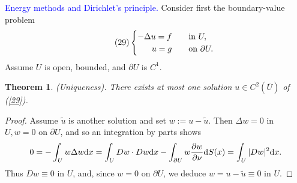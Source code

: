 \documentclass[hyperref,UTF8,12pt]{article}
\numberwithin{equation}{subsection}
\theoremstyle{plain}
\newtheorem{theorem}{Theorem}
\theoremstyle{definition}
\numberwithin{theorem}{section}
\numberwithin{lemma}{section}
\numberwithin{proposition}{section}
\numberwithin{remark}{section}
\numberwithin{corollary}{section}
\numberwithin{definition}{section}
\numberwithin{problem}{section}
\numberwithin{example}{section}
\def\dif{\textup{d}}
\newcommand{\ptl}{\partial}
\begin{document}
\noindent\textcolor{blue}{Energy methods and Dirichlet's principle.} Consider first the boundary-value problem
\[\tag{29}\label{29}\begin{cases}
	\hfill-\Delta u=f&\quad\text{in } U,\\
	\hfill u=g&\quad\text{on } \ptl U.
\end{cases}\]Assume $U$ is open, bounded, and $\ptl U$ is $C^1$.
\begin{theorem}\label{thm2.15}
(Uniqueness). There exists at most one solution $u\in C^2(\bar{U})$ of \textup{(\ref{29})}.
\end{theorem}
\begin{proof}
Assume $\tilde{u}$ is another solution and set $w:=u-\tilde{u}$. Then $\Delta w=0$ in $U,w=0$ on $\ptl U$, and so an integration by parts shows
\[0=-\int_Uw\Delta w\dif x=\int_UDw\cdot Dw\dif x-\int_{\ptl U}w\frac{\ptl w}{\ptl\nu}\dif S(x)=\int_U|Dw|^2\dif x.\]
Thus $Dw\equiv0$ in $U$, and, since $w=0$ on $\ptl U$, we deduce $w=u-\tilde{u}\equiv 0$ in $U$.
\end{proof}
\end{document}
